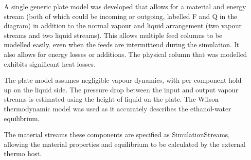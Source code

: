 A single generic plate model was developed that allows for a material
and energy stream (both of which could be incoming or outgoing,
labelled F and Q in the diagram) in addition to the normal vapour and
liquid arrangement (two vapour streams and two liquid streams).  This
allows multiple feed columns to be modelled easily, even when the
feeds are intermittend during the simulation.  It also allows for
energy losses or additions.  The physical column that was modelled
exhibits significant heat losses.

The plate model assumes negligible vapour dynamics, with per-component
hold-up on the liquid side.  The pressure drop between the input and
output vapour streams is estimated using the height of liquid on the
plate.  The Wilson thermodynamic model was used as it accurately describes the ethanol-water equilibrium.

The material streams these components are specified as
SimulationStreams, allowing the material properties and equilibrium to
be calculated by the external thermo host.


